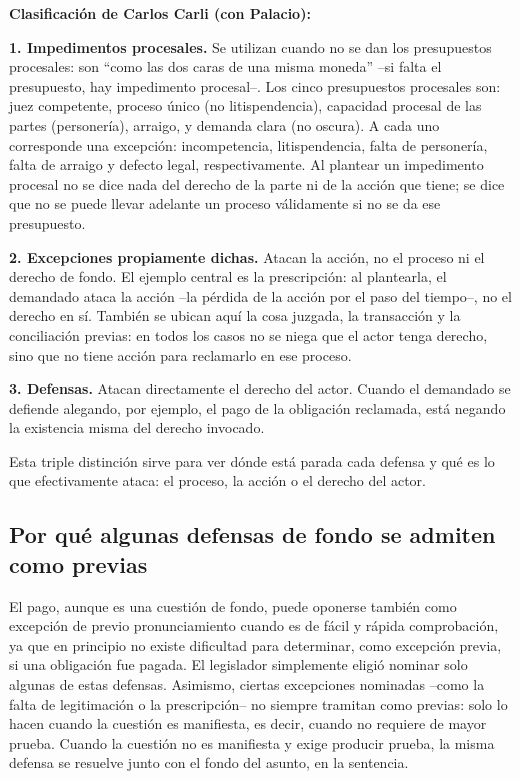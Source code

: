 \documentclass[12pt,oneside]{book}
\begin{document}
\begin{important}
\textbf{Clasificación de Carlos Carli (con Palacio):}

\textbf{1. Impedimentos procesales.} Se utilizan cuando no se dan los presupuestos procesales: son ``como las dos caras de una misma moneda'' --si falta el presupuesto, hay impedimento procesal--. Los cinco presupuestos procesales son: juez competente, proceso único (no litispendencia), capacidad procesal de las partes (personería), arraigo, y demanda clara (no oscura). A cada uno corresponde una excepción: incompetencia, litispendencia, falta de personería, falta de arraigo y defecto legal, respectivamente. Al plantear un impedimento procesal no se dice nada del derecho de la parte ni de la acción que tiene; se dice que no se puede llevar adelante un proceso válidamente si no se da ese presupuesto.

\textbf{2. Excepciones propiamente dichas.} Atacan la acción, no el proceso ni el derecho de fondo. El ejemplo central es la prescripción: al plantearla, el demandado ataca la acción --la pérdida de la acción por el paso del tiempo--, no el derecho en sí. También se ubican aquí la cosa juzgada, la transacción y la conciliación previas: en todos los casos no se niega que el actor tenga derecho, sino que no tiene acción para reclamarlo en ese proceso.

\textbf{3. Defensas.} Atacan directamente el derecho del actor. Cuando el demandado se defiende alegando, por ejemplo, el pago de la obligación reclamada, está negando la existencia misma del derecho invocado.
\end{important}

Esta triple distinción sirve para ver dónde está parada cada defensa y qué es lo que efectivamente ataca: el proceso, la acción o el derecho del actor.

\subsection*{Por qué algunas defensas de fondo se admiten como previas}

El pago, aunque es una cuestión de fondo, puede oponerse también como excepción de previo pronunciamiento cuando es de fácil y rápida comprobación, ya que en principio no existe dificultad para determinar, como excepción previa, si una obligación fue pagada. El legislador simplemente eligió nominar solo algunas de estas defensas. Asimismo, ciertas excepciones nominadas --como la falta de legitimación o la prescripción-- no siempre tramitan como previas: solo lo hacen cuando la cuestión es manifiesta, es decir, cuando no requiere de mayor prueba. Cuando la cuestión no es manifiesta y exige producir prueba, la misma defensa se resuelve junto con el fondo del asunto, en la sentencia.
\end{document}
